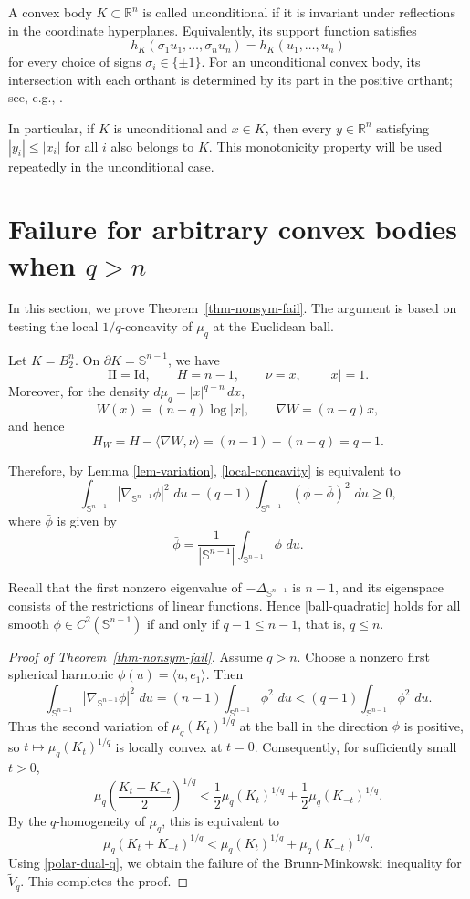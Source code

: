 \documentclass[12pt,leqno]{amsart}
\theoremstyle{plain} \newtheorem{thm}{Theorem}[section]
\theoremstyle{plain} \newtheorem{prop}[thm]{Proposition}
\theoremstyle{plain} \newtheorem{prob}[thm]{Problem}
\theoremstyle{definition} \newtheorem{defi}[thm]{Definition}
\theoremstyle{plain} \newtheorem{cor}[thm]{Corollary}
\theoremstyle{plain} \newtheorem{lem}[thm]{Lemma}
\theoremstyle{plain} \newtheorem{eg}{Example}[section]
\theoremstyle{remark} \newtheorem{rmk}[thm]{Remark}
\theoremstyle{plain} \newtheorem{conj}{Conjecture}
\numberwithin{equation}{section}
\newcommand{\bR}{\mathbb{R}}
\newcommand{\bS}{\mathbb{S}}
\newcommand{\Id}{\mathrm{Id}}
\newcommand{\II}{\mathrm{II}}
\newcommand{\tV}{\widetilde V}
\newcommand{\dd}{\,d}
\begin{document}
A convex body $K\subset \bR^n$ is called unconditional if it is invariant under reflections in the coordinate hyperplanes. Equivalently, its support function satisfies
\[
h_K(\sigma_1 u_1,\dots,\sigma_n u_n)=h_K(u_1,\dots,u_n)
\]
for every choice of signs $\sigma_i\in\{\pm1\}$. For an unconditional convex body, its intersection with each orthant is determined by its part in the positive orthant; see, e.g., \cite{BL95,Sar15,HI26}.

In particular, if $K$ is unconditional and $x\in K$, then every $y\in \bR^n$ satisfying $|y_i|\le |x_i|$ for all $i$ also belongs to $K$. This monotonicity property will be used repeatedly in the unconditional case.

\section{Failure for arbitrary convex bodies when $q>n$}\label{sec-3}

In this section, we prove Theorem~\ref{thm-nonsym-fail}. The argument is based on testing the local $1/q$-concavity of $\mu_q$ at the Euclidean ball.

Let $K=B_2^n$. On $\partial K=\bS^{n-1}$, we have
\[
    \II=\Id,\qquad H=n-1,\qquad \nu=x,\qquad |x|=1.
\]
Moreover, for the density $d\mu_q=|x|^{q-n}\dd x$,
\[
    W(x)=(n-q)\log|x|,\qquad \nabla W=(n-q)x,
\]
and hence
\[
    H_W=H-\langle \nabla W,\nu\rangle=(n-1)-(n-q)=q-1.
\]

Therefore, by Lemma \ref{lem-variation}, \eqref{local-concavity} is equivalent to
\begin{equation}\label{ball-quadratic}
    \int_{\bS^{n-1}}|\nabla_{\bS^{n-1}}\phi|^2\,\dd u
    -(q-1)\int_{\bS^{n-1}}(\phi-\bar\phi)^2\,\dd u\ge 0,
\end{equation}
where $\bar\phi$ is given by
\[
    \bar\phi=\frac{1}{|\bS^{n-1}|}\int_{\bS^{n-1}}\phi\,\dd u.
\]

Recall that the first nonzero eigenvalue of $-\Delta_{\bS^{n-1}}$ is $n-1$, and its eigenspace consists of the restrictions of linear functions. Hence \eqref{ball-quadratic} holds for all smooth $\phi\in C^2(\bS^{n-1})$ if and only if $ q-1\le n-1$, that is, $q\le n.$


\begin{proof}[Proof of Theorem~\ref{thm-nonsym-fail}]
Assume $q>n$. Choose a nonzero first spherical harmonic $\phi(u)=\langle u,e_1\rangle$. Then
\[
    \int_{\bS^{n-1}}|\nabla_{\bS^{n-1}}\phi|^2\,\dd u
    =(n-1)\int_{\bS^{n-1}}\phi^2\,\dd u
    <(q-1)\int_{\bS^{n-1}}\phi^2\,\dd u.
\]
Thus the second variation of $\mu_q(K_t)^{1/q}$ at the ball in the direction $\phi$ is positive, so $t\mapsto \mu_q(K_t)^{1/q}$ is locally convex at $t=0$. Consequently, for sufficiently small $t>0$,
\[
    \mu_q\!\left(\frac{K_t+K_{-t}}{2}\right)^{1/q}
    <
    \frac12\mu_q(K_t)^{1/q}+\frac12\mu_q(K_{-t})^{1/q}.
\]
By the $q$-homogeneity of $\mu_q$, this is equivalent to
\[
    \mu_q(K_t+K_{-t})^{1/q}
    <
    \mu_q(K_t)^{1/q}+\mu_q(K_{-t})^{1/q}.
\]
Using \eqref{polar-dual-q}, we obtain the failure of the Brunn-Minkowski inequality for $\tV_q$. This completes the proof.
\end{proof}
\end{document}
